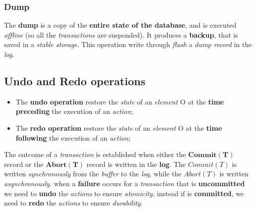 \documentclass{article}
\begin{document}
\subsubsection{Dump}
The \textbf{dump} is a copy of the \textbf{entire state of the database}, and is executed \emph{offline} (so all the \emph{transactions} are suspended). It produces a \textbf{backup}, that is saved in a \emph{stable storage}. This operation write through \emph{flush} a \emph{dump record }in the \emph{log}. 
\subsection{Undo and Redo operations}
\begin{itemize}
\item The\textbf{ undo operation} restore the \emph{state} of an \emph{element} O at the \textbf{time preceding} the execution of an \emph{action};
\item The \textbf{redo operation} restore the \emph{state} of an \emph{element} O at the \textbf{time following} the execution of an \emph{action};
\end{itemize}
The outcome of a \emph{transaction} is established when either the $\mathbf{Commit(T)}$ record or the $\mathbf{Abort(T)}$ record is written in the \textbf{log}. The $Commit(T)$ is written \emph{synchronously} from the \emph{buffer} to the \emph{log}, while the $Abort(T)$ is written \emph{asynchronously}. when a \textbf{failure} occurs for a \emph{transaction} that is \textbf{uncommitted} we need to \textbf{undo} the \emph{actions} to ensure \emph{atomicity}, instead if is \textbf{committed}, we need to \textbf{redo} the \emph{actions} to ensure \emph{durability}.
\end{document}
